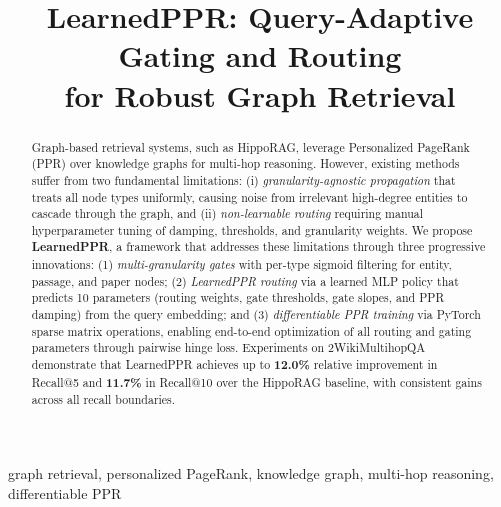 \documentclass[conference,a4paper]{IEEEtran}
\begin{document}
\title{LearnedPPR: Query-Adaptive Gating and Routing\\for Robust Graph Retrieval}

\author{
}
\maketitle

\begin{abstract}
Graph-based retrieval systems, such as HippoRAG, leverage Personalized PageRank (PPR) over knowledge graphs for multi-hop reasoning. However, existing methods suffer from two fundamental limitations: (i) \textit{granularity-agnostic propagation} that treats all node types uniformly, causing noise from irrelevant high-degree entities to cascade through the graph, and (ii) \textit{non-learnable routing} requiring manual hyperparameter tuning of damping, thresholds, and granularity weights. We propose \textbf{LearnedPPR}, a framework that addresses these limitations through three progressive innovations: (1) \textit{multi-granularity gates} with per-type sigmoid filtering for entity, passage, and paper nodes; (2) \textit{LearnedPPR routing} via a learned MLP policy that predicts 10 parameters (routing weights, gate thresholds, gate slopes, and PPR damping) from the query embedding; and (3) \textit{differentiable PPR training} via PyTorch sparse matrix operations, enabling end-to-end optimization of all routing and gating parameters through pairwise hinge loss. Experiments on 2WikiMultihopQA demonstrate that LearnedPPR achieves up to \textbf{12.0\%} relative improvement in Recall@5 and \textbf{11.7\%} in Recall@10 over the HippoRAG baseline, with consistent gains across all recall boundaries.
\end{abstract}

\begin{IEEEkeywords}
graph retrieval, personalized PageRank, knowledge graph, multi-hop reasoning, differentiable PPR
\end{IEEEkeywords}

\end{document}
